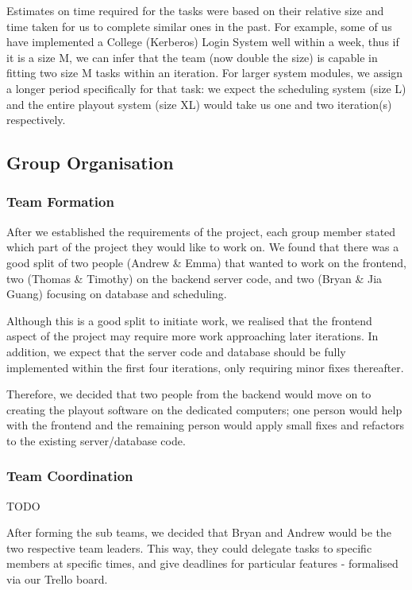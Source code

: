 \documentclass[a4paper, titlepage]{article}
\begin{document}
Estimates on time required for the tasks were based on their relative size and
time taken for us to complete similar ones in the past. For example, some of us
have implemented a College (Kerberos) Login System well within a week, thus if
it is a size M, we can infer that the team (now double the size) is capable in 
fitting two size M tasks within an iteration. For larger system modules, we
assign a longer period specifically for that task: we expect the scheduling
system (size L) and the entire playout system (size XL) would take us one and
two iteration(s) respectively.


\subsection{Group Organisation} \label{sec:projman_group}

\subsubsection{Team Formation}
After we established the requirements of the project, each group member stated
which part of the project they would like to work on. We found that there was a
good split of two people (Andrew \& Emma) that wanted to work on the frontend,
two (Thomas \& Timothy) on the backend server code, and two (Bryan \& Jia Guang)
focusing on database and scheduling.

Although this is a good split to initiate work, we realised that the frontend 
aspect of the project may require more work approaching later iterations.
In addition, we expect that the server code and database should be fully 
implemented within the first four iterations, only requiring minor fixes thereafter.

Therefore, we decided that two people from the backend would move on to creating
the playout software on the dedicated computers; one person would help with the
frontend and the remaining person would apply small fixes and refactors to the
existing server/database code.

\subsubsection{Team Coordination}
TODO

After forming the sub teams, we decided that Bryan and Andrew would be the two respective team 
leaders. This way, they could delegate tasks to specific members at specific times, and give 
deadlines for particular features - formalised via our Trello board.
\end{document}
